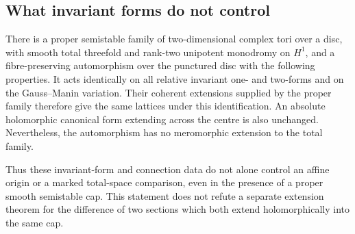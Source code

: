 \subsection{What invariant forms do not control}

\begin{proposition}
\label{push:B429}
There is a proper semistable family of two-dimensional
complex tori over a disc, with smooth total threefold
and rank-two unipotent monodromy on $H^1$, and a
fibre-preserving automorphism over the punctured disc
with the following properties. It acts identically
on all relative invariant one- and two-forms and
on the Gauss--Manin variation. Their coherent
extensions supplied by the proper family therefore
give the same lattices under this identification.
An absolute holomorphic canonical form extending
across the centre is also unchanged. Nevertheless,
the automorphism has no meromorphic extension to
the total family.

Thus these invariant-form and connection data do
not alone control an affine origin or a marked
total-space comparison, even in the presence of
a proper smooth semistable cap. This statement
does not refute a separate extension theorem
for the difference of two sections which both
extend holomorphically into the same cap.
\end{proposition}

